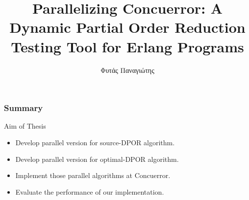 \documentclass[9pt]{beamer}
\title[Short title]{Parallelizing Concuerror: A Dynamic Partial Order Reduction Testing Tool for Erlang Programs} %
\author{Φυτάς Παναγιώτης} %
\institute[NTUA] %
{
ΣΗΜΜΥ - ΕΜΠ \\ %
\medskip
\textit{03112113} %
}
\date{} %
\begin{document}
\begin{frame}
\titlepage %
\end{frame}

\begin{frame}
\frametitle{Summary} %
\tableofcontents %
\end{frame}




\begin{frame}{Aim of Thesis}

\begin{itemize}[<+->]
    \item Develop parallel version for source-DPOR algorithm.
    \item Develop parallel version for optimal-DPOR algorithm.
    \item Implement those parallel algorithms at Concuerror.
    \item Evaluate the performance of our implementation.
\end{itemize}

\end{frame}

\AtBeginSection{\frame{\sectionpage}}
\end{document}
